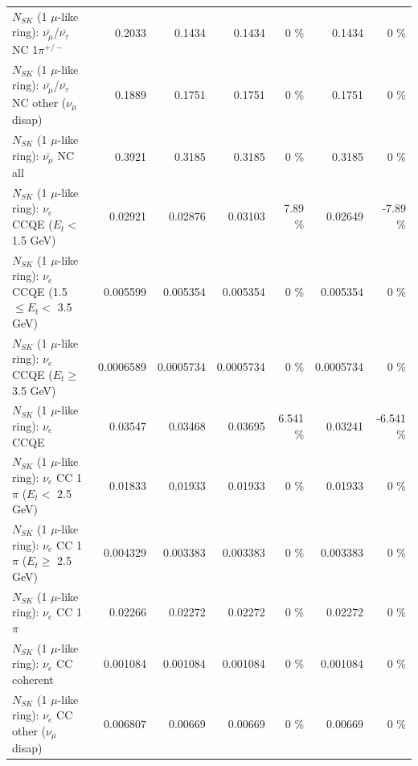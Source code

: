 \begin{table}
\begin{tabular}{| l | r | r | r  r | r  r |}
\hline
  $N_{SK}$ (1 $\mu$-like ring): $\bar{\nu_\mu}$/$\bar{\nu_\tau}$ NC 1$\pi^{+/-}$ &          0.2033 &          0.1434 &          0.1434 &        0 \%  &          0.1434 &        0 \%  \\ 
$N_{SK}$ (1 $\mu$-like ring): $\bar{\nu_\mu}$/$\bar{\nu_\tau}$ NC other ($\nu_\mu$ disap) &          0.1889 &          0.1751 &          0.1751 &        0 \%  &          0.1751 &        0 \%  \\ 
                          $N_{SK}$ (1 $\mu$-like ring): $\bar{\nu_{\mu}}$ NC all &          0.3921 &          0.3185 &          0.3185 &        0 \%  &          0.3185 &        0 \%  \\ 
\hline
\hline
\hline
                  $N_{SK}$ (1 $\mu$-like ring): $\nu_e$ CCQE ($E_{t} <$ 1.5 GeV) &         0.02921 &         0.02876 &         0.03103 &     7.89 \%  &         0.02649 &    -7.89 \%  \\ 
         $N_{SK}$ (1 $\mu$-like ring): $\nu_e$ CCQE (1.5 $\leq E_{t} <$ 3.5 GeV) &        0.005599 &        0.005354 &        0.005354 &        0 \%  &        0.005354 &        0 \%  \\ 
               $N_{SK}$ (1 $\mu$-like ring): $\nu_e$ CCQE ($E_{t} \geq$ 3.5 GeV) &       0.0006589 &       0.0005734 &       0.0005734 &        0 \%  &       0.0005734 &        0 \%  \\ 
\hline
                                      $N_{SK}$ (1 $\mu$-like ring): $\nu_e$ CCQE &         0.03547 &         0.03468 &         0.03695 &    6.541 \%  &         0.03241 &   -6.541 \%  \\ 
\hline
             $N_{SK}$ (1 $\mu$-like ring): $\nu_e$ CC 1$\pi$ ($E_{t} <$ 2.5 GeV) &         0.01833 &         0.01933 &         0.01933 &        0 \%  &         0.01933 &        0 \%  \\ 
          $N_{SK}$ (1 $\mu$-like ring): $\nu_e$ CC 1$\pi$ ($E_{t} \geq$ 2.5 GeV) &        0.004329 &        0.003383 &        0.003383 &        0 \%  &        0.003383 &        0 \%  \\ 
\hline
                                 $N_{SK}$ (1 $\mu$-like ring): $\nu_e$ CC 1$\pi$ &         0.02266 &         0.02272 &         0.02272 &        0 \%  &         0.02272 &        0 \%  \\ 
                               $N_{SK}$ (1 $\mu$-like ring): $\nu_e$ CC coherent &        0.001084 &        0.001084 &        0.001084 &        0 \%  &        0.001084 &        0 \%  \\ 
                $N_{SK}$ (1 $\mu$-like ring): $\nu_e$ CC other ($\nu_\mu$ disap) &        0.006807 &         0.00669 &         0.00669 &        0 \%  &         0.00669 &        0 \%  \\ 

\end{tabular}
\end{table}
